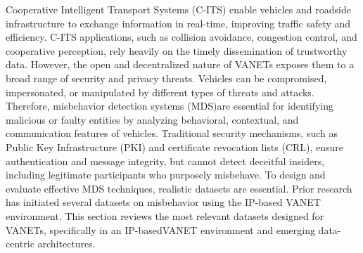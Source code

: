 \documentclass[journal,comsoc]{IEEEtran}
\begin{document}
Cooperative Intelligent Transport Systems (C-ITS) enable vehicles and roadside infrastructure to exchange information in real-time, improving traffic safety and efficiency. C-ITS applications, such as collision avoidance, congestion control, and cooperative perception, rely heavily on the timely dissemination of trustworthy data. However, the open and decentralized nature of VANETs exposes them to a broad range of security and privacy threats. 
Vehicles can be compromised, impersonated, or manipulated by different types of threats and attacks.
Therefore, misbehavior detection systems (MDS)are essential for identifying malicious or faulty entities by analyzing behavioral, contextual, and communication features of vehicles. 
Traditional security mechanisms, such as Public Key Infrastructure (PKI) and certificate revocation lists (CRL), ensure authentication and message integrity, but cannot detect deceitful insiders, including legitimate participants who purposely misbehave. 
To design and evaluate effective MDS techniques, realistic datasets are essential. Prior research has initiated several datasets on misbehavior using the IP-based VANET environment. 
This section reviews the most relevant datasets designed for VANETs, specifically in an IP-basedVANET environment and emerging data-centric architectures. 
\end{document}

